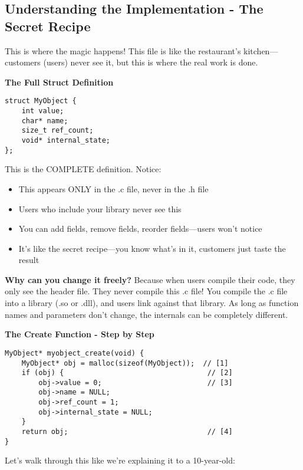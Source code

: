 \subsection*{Understanding the Implementation - The Secret Recipe}

This is where the magic happens! This file is like the restaurant's kitchen---customers (users) never see it, but this is where the real work is done.

\textbf{The Full Struct Definition}

\begin{lstlisting}
struct MyObject {
    int value;
    char* name;
    size_t ref_count;
    void* internal_state;
};
\end{lstlisting}

This is the COMPLETE definition. Notice:

\begin{itemize}
    \item This appears ONLY in the .c file, never in the .h file
    \item Users who include your library never see this
    \item You can add fields, remove fields, reorder fields---users won't notice
    \item It's like the secret recipe---you know what's in it, customers just taste the result
\end{itemize}

\textbf{Why can you change it freely?} Because when users compile their code, they only see the header file. They never compile this .c file! You compile the .c file into a library (.so or .dll), and users link against that library. As long as function names and parameters don't change, the internals can be completely different.

\textbf{The Create Function - Step by Step}

\begin{lstlisting}
MyObject* myobject_create(void) {
    MyObject* obj = malloc(sizeof(MyObject));  // [1]
    if (obj) {                                  // [2]
        obj->value = 0;                         // [3]
        obj->name = NULL;
        obj->ref_count = 1;
        obj->internal_state = NULL;
    }
    return obj;                                 // [4]
}
\end{lstlisting}

Let's walk through this like we're explaining it to a 10-year-old:

